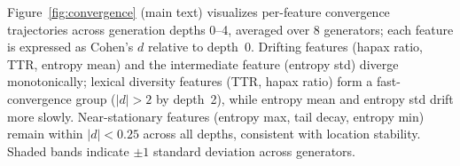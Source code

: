 Figure~\ref{fig:convergence} (main text) visualizes per-feature convergence trajectories across generation depths 0--4, averaged over 8 generators; each feature is expressed as Cohen's $d$ relative to depth~0.
Drifting features (hapax ratio, TTR, entropy mean) and the intermediate feature (entropy std) diverge monotonically; lexical diversity features (TTR, hapax ratio) form a fast-convergence group ($|d| > 2$ by depth~2), while entropy mean and entropy std drift more slowly.
Near-stationary features (entropy max, tail decay, entropy min) remain within $|d| < 0.25$ across all depths, consistent with location stability.
Shaded bands indicate $\pm 1$ standard deviation across generators.

